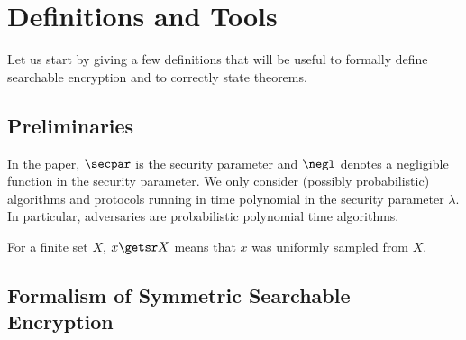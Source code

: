 

\section{Definitions and Tools} %
\label{sec:defs}

Let us start by giving a few definitions that will be useful to formally define searchable encryption and to correctly state theorems.

\subsection{Preliminaries} %
\label{sub:preliminaries}

In the paper, $\secpar$ is the security parameter and $\negl$ denotes a negligible function in the security parameter.
We only consider (possibly probabilistic)  algorithms and protocols running in time polynomial in the security parameter $\lambda$.
In particular, adversaries are probabilistic polynomial time algorithms.

For a finite set $X$, $x \getsr X$ means that $x$ was uniformly sampled from $X$.


\subsection{Formalism of Symmetric Searchable Encryption} %
\label{sub:se_formalism}



